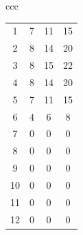 \documentclass[11pt]{article}
\begin{document}
\begin{itemize}
\begin{itemize}
\begin{table}[H]
\begin{tabular}{ccc}
\begin{tabular}{|c|c|c|c|}
	1 & 7 & 11 & 15 \\
	2 & 8 & 14 & 20 \\
	3 & 8 & 15 & 22 \\
	4 & 8 & 14 & 20 \\
	5 & 7 & 11 & 15 \\
	6 & 4 & 6 & 8 \\
	7 & 0 & 0 & 0 \\
	8 & 0 & 0 & 0 \\
	9 & 0 & 0 & 0 \\
	10 & 0 & 0 & 0 \\
	11 & 0 & 0 & 0 \\
	12 & 0 & 0 & 0 \\
	\hline
\end{tabular}
\end{tabular}

\vspace{1em}


\end{table}
\end{itemize}
\end{itemize}
\end{document}
